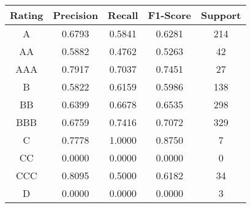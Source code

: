 \footnotesize
\begin{tabular}{ccccc}
\toprule
Rating & Precision & Recall & F1-Score & Support \\
\midrule
A & 0.6793 & 0.5841 & 0.6281 & 214 \\
AA & 0.5882 & 0.4762 & 0.5263 & 42 \\
AAA & 0.7917 & 0.7037 & 0.7451 & 27 \\
B & 0.5822 & 0.6159 & 0.5986 & 138 \\
BB & 0.6399 & 0.6678 & 0.6535 & 298 \\
BBB & 0.6759 & 0.7416 & 0.7072 & 329 \\
C & 0.7778 & 1.0000 & 0.8750 & 7 \\
CC & 0.0000 & 0.0000 & 0.0000 & 0 \\
CCC & 0.8095 & 0.5000 & 0.6182 & 34 \\
D & 0.0000 & 0.0000 & 0.0000 & 3 \\
\bottomrule
\end{tabular}

\normalsize